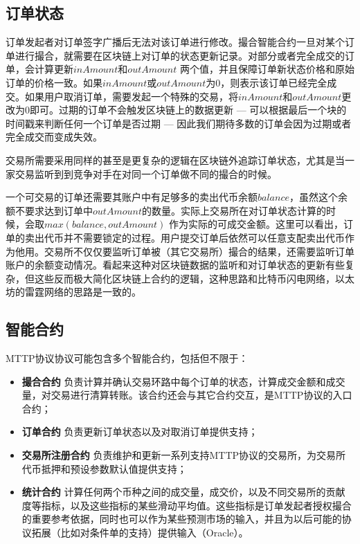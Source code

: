 \documentclass[UTF8,nofonts]{ctexart}
\begin{document}
\subsection{订单状态\label{sec:orderstate}}

订单发起者对订单签字广播后无法对该订单进行修改。撮合智能合约一旦对某个订单进行撮合，就需要在区块链上对订单的状态更新记录。对部分或者完全成交的订单，会计算更新$inAmount$和$outAmount$ 两个值，并且保障订单新状态价格和原始订单的价格一致。如果$inAmount$或$outAmount$为0，则表示该订单已经完全成交。如果用户取消订单，需要发起一个特殊的交易，将$inAmount$和$outAmount$更改为0即可。过期的订单不会触发区块链上的数据更新 --- 可以根据最后一个块的时间戳来判断任何一个订单是否过期 --- 因此我们期待多数的订单会因为过期或者完全成交而变成失效。

交易所需要采用同样的甚至是更复杂的逻辑在区块链外追踪订单状态，尤其是当一家交易监听到到竞争对手在对同一个订单做不同的撮合的时候。


一个可交易的订单还需要其账户中有足够多的卖出代币余额$balance$，虽然这个余额不要求达到订单中$outAmount$的数量。实际上交易所在对订单状态计算的时候，会取$max(balance, outAmount)$ 作为实际的可成交金额。这里可以看出，订单的卖出代币并不需要锁定的过程。用户提交订单后依然可以任意支配卖出代币作为他用。交易所不仅仅要监听订单被（其它交易所）撮合的结果，还需要监听订单账户的余额变动情况。看起来这种对区块链数据的监听和对订单状态的更新有些复杂，但这些反而极大简化区块链上合约的逻辑，这种思路和比特币闪电网络，以太坊的雷霆网络的思路是一致的。

\subsection{智能合约\label{sec:contracts}}

MTTP协议协议可能包含多个智能合约，包括但不限于：

\begin{itemize}
	\item  \textbf{撮合合约} 负责计算并确认交易环路中每个订单的状态，计算成交金额和成交量，对交易进行清算转账。该合约还会与其它合约交互，是MTTP协议的入口合约；
	\item   \textbf{订单合约} 负责更新订单状态以及对取消订单提供支持；
	\item  \textbf{交易所注册合约}  负责维护和更新一系列支持MTTP协议的交易所，为交易所代币抵押和预设参数默认值提供支持；
	\item \textbf{统计合约}  计算任何两个币种之间的成交量，成交价，以及不同交易所的贡献度等指标，以及这些指标的某些滑动平均值。这些指标是订单发起者授权撮合的重要参考依据，同时也可以作为某些预测市场的输入，并且为以后可能的协议拓展（比如对条件单的支持）提供输入（Oracle）。
\end{itemize}
\end{document}
